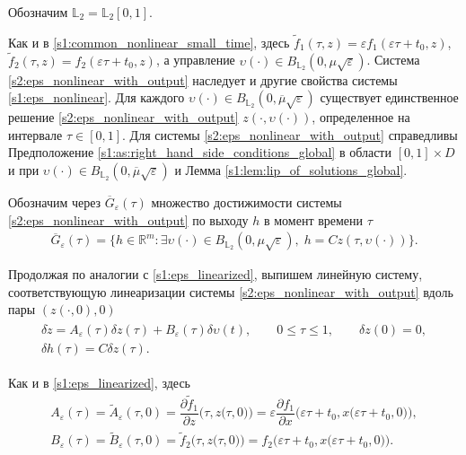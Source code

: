 \documentclass[../main.tex]{subfiles}
\begin{document}
Обозначим $\mathbb{L}_2 = \mathbb{L}_2[0, 1]$. 

Как и в \eqref{s1:common_nonlinear_small_time}, здесь $ \widetilde{f}_1(\tau,z) = \varepsilon f_1(\varepsilon \tau + t_0, z) $, $ \widetilde{f}_2 (\tau,z) = f_2(\varepsilon \tau + t_0,z)$, а управление $ \upsilon(\cdot) \in B_{\mathbb{L}_2}(0, \mu\sqrt{\varepsilon})$.
Система \eqref{s2:eps_nonlinear_with_output} наследует и другие свойства системы \eqref{s1:eps_nonlinear}.
Для каждого $\upsilon(\cdot) \in B_{\mathbb{L}_2} (0, \overline{\mu} \sqrt{\varepsilon})$ существует единственное решение \eqref{s2:eps_nonlinear_with_output} $z(\cdot, \upsilon(\cdot))$, определенное на интервале $\tau \in [0,1]$. 
Для системы \eqref{s2:eps_nonlinear_with_output} справедливы Предположение \ref{s1:as:right_hand_side_conditions_global} в области $[0, 1]\times D$ и при $\upsilon(\cdot) \in B_{\mathbb{L}_2}(0, \overline{\mu}\sqrt{\varepsilon}) $ и 
Лемма \ref{s1:lem:lip_of_solutions_global}.

Обозначим через $\overline{G}_{\varepsilon}(\tau)$ множество достижимости системы \eqref{s2:eps_nonlinear_with_output} по выходу $h$ в момент времени $\tau$
\begin{gather*}
	\overline{G}_{\varepsilon}(\tau)=\{h\in \mathbb{R}^m:\exists \upsilon(\cdot)\in B_{\mathbb{L}_2}(0,\mu\sqrt{\varepsilon}),\; h=Cz(\tau,\upsilon(\cdot))\}.
\end{gather*}

Продолжая по аналогии с \eqref{s1:eps_linearized}, выпишем линейную систему, соответствующую линеаризации системы \eqref{s2:eps_nonlinear_with_output} вдоль пары $(z(\cdot, 0), 0)$ 
\begin{gather}\label{s2:eps_linearized}
\begin{gathered}
	\delta\dot{z} = A_{\varepsilon}(\tau) \delta z(\tau) + B_{\varepsilon}(\tau) \delta \upsilon(t),\qquad 0 \leqslant \tau \leqslant 1, \qquad \delta z(0) = 0, \\
	\delta h(\tau) = C \delta z(\tau).
\end{gathered}
\end{gather}

Как и в \eqref{s1:eps_linearized}, здесь 
\begin{gather*}
	A_{\varepsilon}(\tau) = \widetilde{A}_{\varepsilon}(\tau, 0) = \dfrac{\partial \widetilde{f}_1}{\partial z} \Big(\tau, z\big(\tau, 0 \big)\Big) = \varepsilon \dfrac{\partial f_1}{\partial x} \Big(\varepsilon \tau + t_0,x\big(\varepsilon \tau + t_0, 0\big)\Big), \\
	B_{\varepsilon}(\tau) = \widetilde{B}_{\varepsilon}(\tau, 0) = \widetilde{f}_2 \Big(\tau,z\big(\tau, 0\big)\Big) = f_2 \Big(\varepsilon \tau + t_0, x\big(\varepsilon \tau + t_0, 0\big)\Big).
\end{gather*} 
\end{document}
